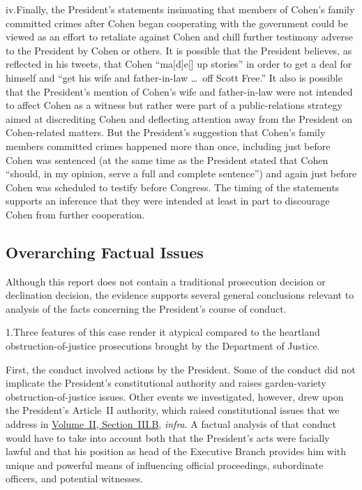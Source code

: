 \qquad iv.\qquad Finally, the President's statements insinuating that members of Cohen's family committed crimes after Cohen began cooperating with the government could be viewed as an effort to retaliate against Cohen and chill further testimony adverse to the President by Cohen or others.
It is possible that the President believes, as reflected in his tweets, that Cohen ``ma[d]e[] up stories'' in order to get a deal for himself and ``get his wife and father-in-law \dots\ off Scott Free.'' It also is possible that the President's mention of Cohen's wife and father-in-law were not intended to affect Cohen as a witness but rather were part of a public-relations strategy aimed at discrediting Cohen and deflecting attention away from the President on Cohen-related matters.
But the President's suggestion that Cohen's family members committed crimes happened more than once, including just before Cohen was sentenced (at the same time as the President stated that Cohen ``should, in my opinion, serve a full and complete sentence'') and again just before Cohen was scheduled to testify before Congress.
The timing of the statements supports an inference that they were intended at least in part to discourage Cohen from further cooperation.

\subsection{Overarching Factual Issues}

Although this report does not contain a traditional prosecution decision or declination decision, the evidence supports several general conclusions relevant to analysis of the facts concerning the President's course of conduct.

1.\quad Three features of this case render it atypical compared to the heartland obstruction-of-justice prosecutions brought by the Department of Justice.

First, the conduct involved actions by the President.
Some of the conduct did not implicate the President's constitutional authority and raises garden-variety obstruction-of-justice issues.
Other events we investigated, however, drew upon the President's Article~II authority, which raised constitutional issues that we address in \hyperlink{subsection.2.3.2}{Volume~II, Section~III.B}, \textit{infra}.
A factual analysis of that conduct would have to take into account both that the President's acts were facially lawful and that his position as head of the Executive Branch provides him with unique and powerful means of influencing official proceedings, subordinate officers, and potential witnesses.

